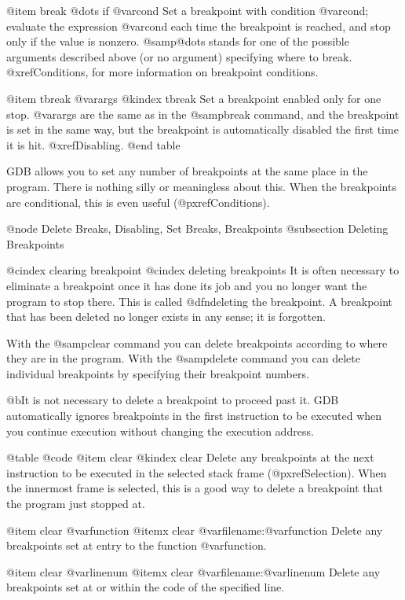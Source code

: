 @item break @dots{} if @var{cond}
Set a breakpoint with condition @var{cond}; evaluate the expression
@var{cond} each time the breakpoint is reached, and stop only if the
value is nonzero.  @samp{@dots{}} stands for one of the possible
arguments described above (or no argument) specifying where to break.
@xref{Conditions}, for more information on breakpoint conditions.

@item tbreak @var{args}
@kindex tbreak
Set a breakpoint enabled only for one stop.  @var{args} are the
same as in the @samp{break} command, and the breakpoint is set in the same
way, but the breakpoint is automatically disabled the first time it
is hit.  @xref{Disabling}.
@end table

GDB allows you to set any number of breakpoints at the same place in the
program.  There is nothing silly or meaningless about this.  When the
breakpoints are conditional, this is even useful (@pxref{Conditions}).

@node Delete Breaks, Disabling, Set Breaks, Breakpoints
@subsection Deleting Breakpoints

@cindex clearing breakpoint
@cindex deleting breakpoints
It is often necessary to eliminate a breakpoint once it has done its job
and you no longer want the program to stop there.  This is called
@dfn{deleting} the breakpoint.  A breakpoint that has been deleted no
longer exists in any sense; it is forgotten.

With the @samp{clear} command you can delete breakpoints according to where
they are in the program.  With the @samp{delete} command you can delete
individual breakpoints by specifying their breakpoint numbers.

@b{It is not necessary to delete a breakpoint to proceed past it.}  GDB
automatically ignores breakpoints in the first instruction to be executed
when you continue execution without changing the execution address.

@table @code
@item clear
@kindex clear
Delete any breakpoints at the next instruction to be executed in the
selected stack frame (@pxref{Selection}).  When the innermost frame
is selected, this is a good way to delete a breakpoint that the program
just stopped at.

@item clear @var{function}
@itemx clear @var{filename}:@var{function}
Delete any breakpoints set at entry to the function @var{function}.

@item clear @var{linenum}
@itemx clear @var{filename}:@var{linenum}
Delete any breakpoints set at or within the code of the specified line.

